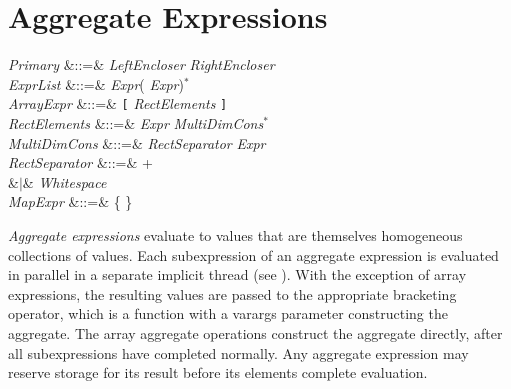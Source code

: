 %
%
%
%

\section{Aggregate Expressions}



\begin{Grammar}
\emph{Primary}
&::=& \emph{LeftEncloser}   \emph{RightEncloser} \\

\emph{ExprList} &::=& \emph{Expr}(\EXP{,} \emph{Expr})$^*$ \\

\emph{ArrayExpr} &::=& \texttt{[}  \emph{RectElements} \texttt{]}\\

\emph{RectElements} &::=& \emph{Expr} \emph{MultiDimCons}$^*$\\

\emph{MultiDimCons} &::=& \emph{RectSeparator} \emph{Expr}\\

\emph{RectSeparator} &::=& \EXP{;}+\\
&$|$& \emph{Whitespace}\\

\emph{MapExpr} &::=& \{   \}\\
\end{Grammar}

\emph{Aggregate expressions} evaluate to values that are themselves
homogeneous collections of values.  Each subexpression of an aggregate
expression is evaluated in parallel in a separate implicit thread (see
).
With the exception of array expressions, the resulting
values are passed to the appropriate bracketing operator, which is a
function with a varargs parameter constructing the aggregate.
The array aggregate operations
construct the aggregate directly, after all
subexpressions have completed normally.  Any aggregate expression may
reserve storage for its result before its elements complete
evaluation.

